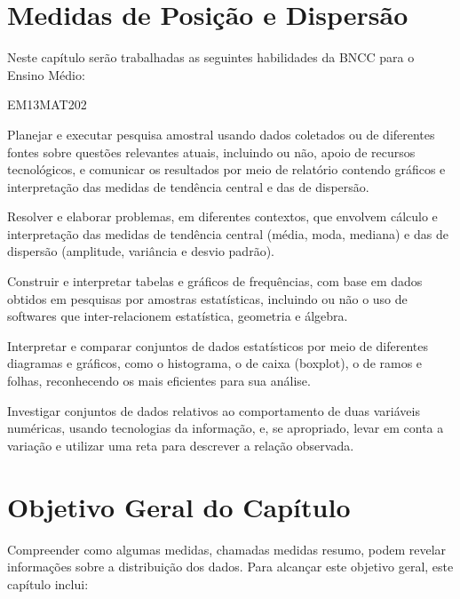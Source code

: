 \mainmatter

\begin{apresentacao}
\section{Medidas de Posição e Dispersão}

Neste capítulo serão trabalhadas as seguintes habilidades da BNCC para o Ensino Médio:

\begin{habilities}{EM13MAT202}

Planejar e executar pesquisa amostral usando dados coletados ou de diferentes fontes sobre questões relevantes atuais, incluindo ou não, apoio de recursos tecnológicos, e comunicar os resultados por meio de relatório contendo gráficos e interpretação das medidas de tendência central e das de dispersão.

 Resolver e elaborar problemas, em diferentes contextos, que envolvem cálculo e interpretação das medidas de tendência central (média, moda, mediana) e das de dispersão (amplitude, variância e desvio padrão).

 Construir e interpretar tabelas e gráficos de frequências, com base em dados obtidos em pesquisas por amostras estatísticas, incluindo ou não o uso de softwares que inter-relacionem estatística, geometria e álgebra.

 Interpretar e comparar conjuntos de dados estatísticos por meio de diferentes diagramas e gráficos, como o histograma, o de caixa (boxplot), o de ramos e folhas, reconhecendo os mais eficientes para sua análise.

 Investigar conjuntos de dados relativos ao comportamento de duas variáveis numéricas, usando tecnologias da informação, e, se apropriado, levar em conta a variação e utilizar uma reta para descrever a relação observada.
\end{habilities}

\section{Objetivo Geral do Capítulo}

Compreender como algumas medidas, chamadas medidas resumo, podem revelar informações sobre a distribuição dos dados. Para alcançar este objetivo geral, este capítulo inclui:


\end{apresentacao}

